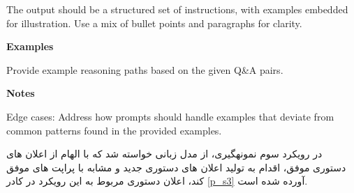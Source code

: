 \begin{tcolorbox}[breakable,colframe=mybluecolor!100, colback=mybluecolor!20, title=اعلان دستوری برای نمونه\/گیری براساس توضیح مسئله و چند نمونه مثال از مجموعه داده]
\begin{LTR}
	The output should be a structured set of instructions, with examples embedded for illustration. Use a mix of bullet points and paragraphs for clarity.
	
	\textbf{Examples}
	
	Provide example reasoning paths based on the given Q\&A pairs.
	
	\textbf{Notes}  
	
	Edge cases: Address how prompts should handle examples that deviate from common patterns found in the provided examples.
	\end{LTR}
\end{tcolorbox}

در رویکرد سوم نمونه\/گیری، از مدل زبانی خواسته شد که با الهام از اعلان های دستوری موفق، اقدام به تولید اعلان های دستوری جدید و مشابه با پراپت های موفق کند، اعلان دستوری مربوط به این رویکرد در کادر \ref{p_s3} آورده شده است.

